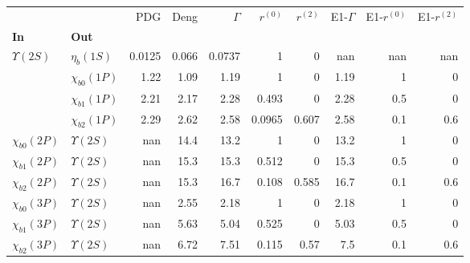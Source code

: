 \begin{tabular}{l|l|r|r|r|r|r|r|r|r}
\toprule
                &                &    PDG &  Deng &  $\Gamma$ &  $r^{(0)}$ &  $r^{(2)}$ &  E1-$\Gamma$ &  E1-$r^{(0)}$ &  E1-$r^{(2)}$ \\
\textbf{In} & \textbf{Out} &        &       &           &            &            &              &               &               \\
\midrule
\textbf{$\Upsilon(2S)$} & \textbf{$\eta_{b}(1S)$} & 0.0125 & 0.066 &    0.0737 &          1 &          0 &          nan &           nan &           nan \\
                & \textbf{$\chi_{b0}(1P)$} &   1.22 &  1.09 &      1.19 &          1 &          0 &         1.19 &             1 &             0 \\
                & \textbf{$\chi_{b1}(1P)$} &   2.21 &  2.17 &      2.28 &      0.493 &          0 &         2.28 &           0.5 &             0 \\
                & \textbf{$\chi_{b2}(1P)$} &   2.29 &  2.62 &      2.58 &     0.0965 &      0.607 &         2.58 &           0.1 &           0.6 \\
\textbf{$\chi_{b0}(2P)$} & \textbf{$\Upsilon(2S)$} &    nan &  14.4 &      13.2 &          1 &          0 &         13.2 &             1 &             0 \\
\textbf{$\chi_{b1}(2P)$} & \textbf{$\Upsilon(2S)$} &    nan &  15.3 &      15.3 &      0.512 &          0 &         15.3 &           0.5 &             0 \\
\textbf{$\chi_{b2}(2P)$} & \textbf{$\Upsilon(2S)$} &    nan &  15.3 &      16.7 &      0.108 &      0.585 &         16.7 &           0.1 &           0.6 \\
\textbf{$\chi_{b0}(3P)$} & \textbf{$\Upsilon(2S)$} &    nan &  2.55 &      2.18 &          1 &          0 &         2.18 &             1 &             0 \\
\textbf{$\chi_{b1}(3P)$} & \textbf{$\Upsilon(2S)$} &    nan &  5.63 &      5.04 &      0.525 &          0 &         5.03 &           0.5 &             0 \\
\textbf{$\chi_{b2}(3P)$} & \textbf{$\Upsilon(2S)$} &    nan &  6.72 &      7.51 &      0.115 &       0.57 &          7.5 &           0.1 &           0.6 \\
\bottomrule
\end{tabular}
